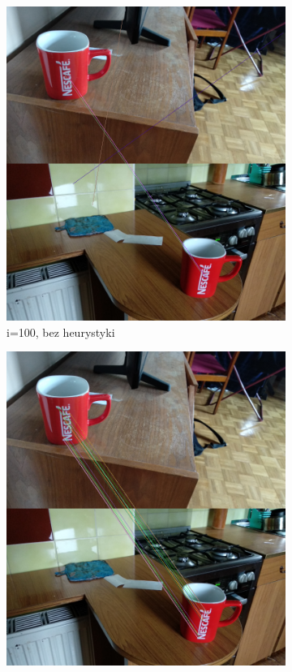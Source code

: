 \documentclass{article}
\begin{document}
	\begin{figure}[H]
		\centering
		\begin{subfigure}[b]{0.35\linewidth}
			\includegraphics[width=\linewidth]{100m1.png}
			\caption{i=100, bez heurystyki}
		\end{subfigure}
		\begin{subfigure}[b]{0.35\linewidth}
			\includegraphics[width=\linewidth]{100m2.png}

\end{subfigure}
\end{figure}
\end{document}
